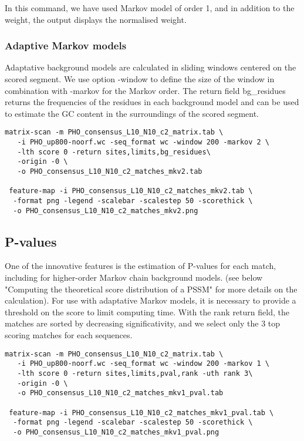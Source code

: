 In this command, we have used Markov model of order 1, and in addition to the weight, the output displays the normalised weight.

\subsubsection{Adaptive Markov models}
Adaptative background models are calculated in sliding windows centered on the scored segment. We use option -window to define the size of the window in combination with -markov for the Markov order. The return field bg\_residues returns the frequencies of the residues in each background model and can be used to estimate the GC content in the surroundings of the scored segment. 

{\color{Blue} \begin{footnotesize} 
\begin{verbatim}
matrix-scan -m PHO_consensus_L10_N10_c2_matrix.tab \
   -i PHO_up800-noorf.wc -seq_format wc -window 200 -markov 2 \
   -lth score 0 -return sites,limits,bg_residues\
   -origin -0 \
   -o PHO_consensus_L10_N10_c2_matches_mkv2.tab
   
 feature-map -i PHO_consensus_L10_N10_c2_matches_mkv2.tab \
  -format png -legend -scalebar -scalestep 50 -scorethick \
  -o PHO_consensus_L10_N10_c2_matches_mkv2.png 

\end{verbatim} \end{footnotesize}
}

\subsection{P-values}
One of the \program{matrix-scan} innovative features is the estimation of P-values for each match, including for higher-order Markov chain background models. (see below "Computing the theoretical score distribution of a PSSM" for more details on the calculation).  For use with adaptative Markov models, it is necessary to provide a threshold on the score to limit computing time. With the rank return field, the matches are sorted by decreasing significativity, and we select only the 3 top scoring matches for each sequences.

{\color{Blue} \begin{footnotesize} 
\begin{verbatim}
matrix-scan -m PHO_consensus_L10_N10_c2_matrix.tab \
   -i PHO_up800-noorf.wc -seq_format wc -window 200 -markov 1 \
   -lth score 0 -return sites,limits,pval,rank -uth rank 3\
   -origin -0 \
   -o PHO_consensus_L10_N10_c2_matches_mkv1_pval.tab
   
 feature-map -i PHO_consensus_L10_N10_c2_matches_mkv1_pval.tab \
  -format png -legend -scalebar -scalestep 50 -scorethick \
  -o PHO_consensus_L10_N10_c2_matches_mkv1_pval.png 

\end{verbatim} \end{footnotesize}
}

